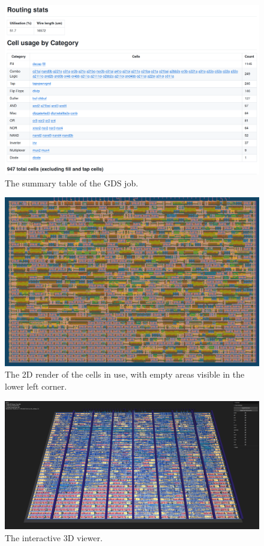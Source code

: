\begin{figure}[htp]
\centering
\includegraphics[width=\columnwidth]{./Figs/gh action cell stats.png}
\caption{The summary table of the GDS job.}
\label{fig:summary_table_GDS_job}
\end{figure}

\begin{figure}[htp]
\centering
\includegraphics[width=\columnwidth]{./Figs/gh action gds layout.png}
\caption{The 2D render of the cells in use, with empty areas visible in the lower left corner.}
\label{fig:render_cells_in_use}
\end{figure}

\begin{figure}[htp]
\centering
\includegraphics[width=\columnwidth]{./Figs/gh action gds 3d view.png}
\caption{The interactive 3D viewer.}
\label{fig:interactive_3D_viewer}
\end{figure}

